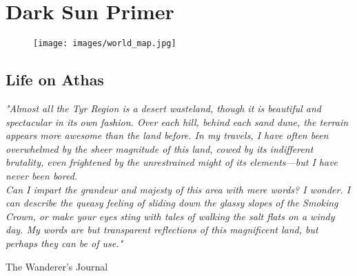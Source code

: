 \chapter{Dark Sun Primer}

\begin{figure}[H]
\centering
\texttt{[image: images/world\_map.jpg]}
\end{figure}

\section{Life on Athas}

\epigraph{\textit{
"Almost all the Tyr Region is a desert wasteland, though it is beautiful and
spectacular in its own fashion. Over each hill, behind each sand dune, the
terrain appears more awesome than the land before. In my travels, I have
often been overwhelmed by the sheer magnitude of this land, cowed by its
indifferent brutality, even frightened by the unrestrained
might of its elements—but I have never been bored.\\
Can I impart the grandeur and majesty of this area with mere words? I
wonder. I can describe the queasy feeling of sliding down the glassy
slopes of the Smoking Crown, or make your eyes sting with tales of
walking the salt flats on a windy day. My words are but transparent
reflections of this magnificent land, but perhaps they can be of use." }}
{ The Wanderer’s Journal }

